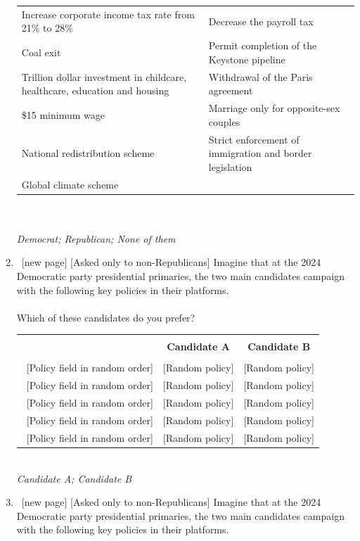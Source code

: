 \begin{enumerate}[resume]
\begin{tabular}{|>{\centering\arraybackslash}p{7cm}|>{\centering\arraybackslash}p{7cm}|}
        Increase corporate income tax rate from 21\% to 28\% & Decrease the payroll tax \\ 
        Coal exit & Permit completion of the Keystone pipeline \\ 
        Trillion dollar investment in childcare, healthcare, education and housing & Withdrawal of the Paris agreement \\ 
        \$15 minimum wage & Marriage only for opposite-sex couples \\ 
        National redistribution scheme & Strict enforcement of immigration and border legislation \\ 
        Global climate scheme &  \\ 
        \hline
    \end{tabular}\\ 
\\ \textit{Democrat; Republican; None of them}
\item ~[new page] [Asked only to non-Republicans] Imagine that at the 2024 Democratic party presidential primaries, the two main candidates campaign with the following key policies in their platforms.\\
\\
Which of these candidates do you prefer?\\
\begin{tabular}{@{\extracolsep{5pt}}|c|c|c|} 
    \hline \\[-1.8ex] 
    & \textbf{Candidate A} & \textbf{Candidate B}  \\ \hline \\[-1.8ex]
    ~[Policy field in random order] & [Random policy] & [Random policy] \\ 
    ~[Policy field in random order] & [Random policy] & [Random policy] \\ 
    ~[Policy field in random order] & [Random policy] & [Random policy] \\ 
    ~[Policy field in random order] & [Random policy] & [Random policy] \\ 
    ~[Policy field in random order] & [Random policy] & [Random policy] \\ 
    \hline 
\end{tabular} 
\\ \textit{Candidate A; Candidate B}
\item ~[new page] [Asked only to non-Republicans] Imagine that at the 2024 Democratic party presidential primaries, the two main candidates campaign with the following key policies in their platforms.\\

\end{enumerate}
